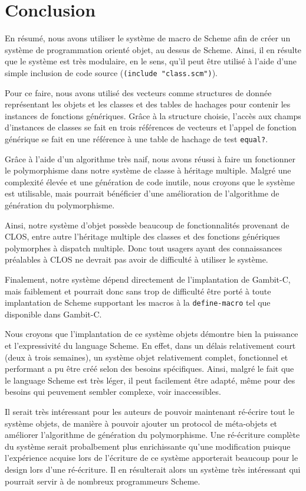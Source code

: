 
\section{Conclusion}
  En résumé, nous avons utiliser le système de macro de Scheme afin de
  créer un système de programmation orienté objet, au dessus de
  Scheme. Ainsi, il en résulte que le système est très modulaire, en
  le sens, qu'il peut être utilisé à l'aide d'une simple inclusion de
  code source (\texttt{(include "class.scm")}). 

  Pour ce faire, nous avons utilisé des vecteurs comme structures de
  donnée représentant les objets et les classes et des tables de
  hachages pour contenir les instances de fonctions génériques. Grâce
  à la structure choisie, l'accès aux champs d'instances de classes se
  fait en trois références de vecteurs et l'appel de fonction
  générique se fait en une référence à une table de hachage de test
  \texttt{equal?}.

  Grâce à l'aide d'un algorithme très naif, nous avons réussi à faire
  un fonctionner le polymorphisme dans notre système de classe à
  héritage multiple. Malgré une complexité élevée et une génération de
  code inutile, nous croyons que le système est utilisable, mais
  pourrait bénéficier d'une amélioration de l'algorithme de génération
  du polymorphisme.

  Ainsi, notre système d'objet possède beaucoup de fonctionnalités
  provenant de CLOS, entre autre l'héritage multiple des classes et
  des fonctions génériques polymorphes à \og dispatch \fg
  multiple. Donc tout usagers ayant des connaissances préalables à
  CLOS ne devrait pas avoir de difficulté à utiliser le système.

  Finalement, notre système dépend directement de l'implantation de
  Gambit-C, mais faiblement et pourrait donc sans trop de difficulté
  être porté à toute implantation de Scheme supportant les macros à la
  \texttt{define-macro} tel que disponible dans Gambit-C.

  Nous croyons que l'implantation de ce système objets démontre bien
  la puissance et l'expressivité du language Scheme. En effet, dans un
  délais relativement court (deux à trois semaines), un système objet
  relativement complet, fonctionnel et performant a pu être créé selon
  des besoins spécifiques. Ainsi, malgré le fait que le language
  Scheme est très léger, il peut facilement être adapté, même pour des
  besoins qui peuvement sembler complexe, voir inaccessibles.

  Il serait très intéressant pour les auteurs de pouvoir maintenant
  ré-écrire tout le système objets, de manière à pouvoir ajouter un
  protocol de méta-objets et améliorer l'algorithme de génération du
  polymorphisme. Une ré-écriture complète du système serait
  probalbement plus enrichissante qu'une modification puisque
  l'expérience acquise lors de l'écriture de ce système apporterait
  beaucoup pour le design lors d'une ré-écriture. Il en résulterait
  alors un système très intéressant qui pourrait servir à de nombreux
  programmeurs Scheme.

